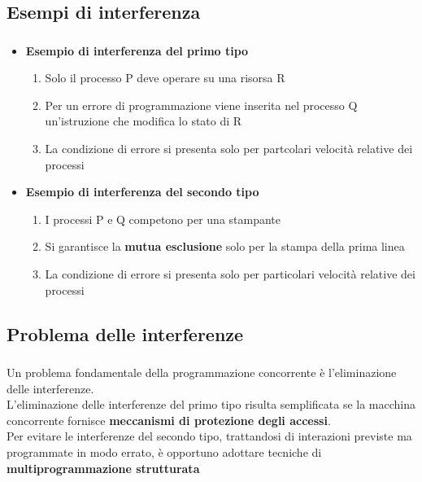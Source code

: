 \documentclass{beamer}
\newenvironment{mainframe}{
	\begin{frame}
		\frametitle{\insertsubsection}
		\framesubtitle{\insertsection}
	}{
	\end{frame}
}
\begin{document}
\subsection{Esempi di interferenza}
\begin{mainframe}
	\begin{itemize}
		\item \textbf{Esempio di interferenza del primo tipo}
		\begin{enumerate}
			\item Solo il processo P deve operare su una risorsa R
			\item Per un errore di programmazione viene inserita nel processo Q un'istruzione che modifica lo stato di R
			\item La condizione di errore si presenta solo per partcolari velocità relative dei processi
		\end{enumerate}
		\item \textbf{Esempio di interferenza del secondo tipo}
		\begin{enumerate}
			\item I processi P e Q competono per una stampante
			\item Si garantisce la \textbf{mutua esclusione} solo per la stampa della prima linea
			\item La condizione di errore si presenta solo per particolari velocità relative dei processi
		\end{enumerate}
	\end{itemize}
\end{mainframe}
\subsection{Problema delle interferenze}
\begin{mainframe}
	Un problema fondamentale della programmazione concorrente è l'eliminazione delle interferenze.\\
	L'eliminazione delle interferenze del primo tipo risulta semplificata se la macchina concorrente fornisce \textbf{meccanismi di protezione degli accessi}.\\
	Per evitare le interferenze del secondo tipo, trattandosi di interazioni previste ma programmate in modo errato, è opportuno adottare tecniche di \textbf{multiprogrammazione strutturata}
\end{mainframe}
\end{document}
